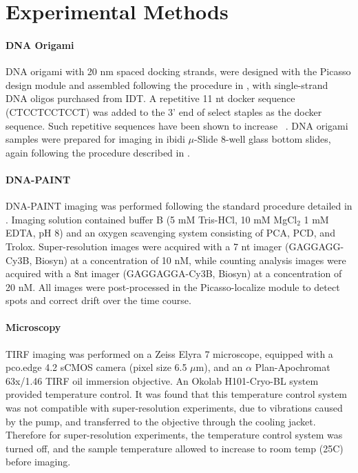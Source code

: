 \section{Experimental Methods}


\paragraph{DNA Origami}
DNA origami with 20 nm spaced docking strands, were designed with the Picasso design module \cite{schnitzbauer_2017}
and assembled following the procedure in \cite{schnitzbauer_2017}, with single-strand DNA oligos purchased from IDT.
  A repetitive 11 nt docker sequence (CTCCTCCTCCT) was added to the 3' end of select staples as the docker sequence.
  Such repetitive sequences have been shown to increase \pon~\citep{civitci_2020}.
  DNA origami samples were prepared for imaging in ibidi $\mu$-Slide 8-well glass bottom slides, 
  again following the procedure described in \cite{schnitzbauer_2017}. 
  
\paragraph{DNA-PAINT}
DNA-PAINT imaging was performed following the standard procedure detailed in \cite{schnitzbauer_2017}. 
  Imaging solution contained buffer B (5 mM Tris-HCl, 10 mM MgCl$_2$ 1 mM EDTA, pH 8) and an oxygen scavenging system consisting of PCA, PCD, and Trolox.
  Super-resolution images were acquired with a 7 nt imager (GAGGAGG-Cy3B, Biosyn) at a concentration of 10 nM,
  while counting analysis images were acquired with a 8nt imager (GAGGAGGA-Cy3B, Biosyn) at a concentration of 20 nM.
  All images were post-processed in the Picasso-localize module to detect spots and correct drift over the time course. 

\paragraph{Microscopy}

TIRF imaging was performed on a Zeiss Elyra 7 microscope, equipped with 
a pco.edge 4.2 sCMOS camera (pixel size 6.5 $\mu$m), and an $\alpha$ 
Plan-Apochromat 63x/1.46 TIRF oil immersion objective.
  An Okolab H101-Cryo-BL system provided temperature control. 
  It was found that this temperature control system was not compatible with super-resolution experiments, 
  due to vibrations caused by the pump, and transferred to the objective through the cooling jacket.
  Therefore for super-resolution experiments, the temperature control system was turned off, 
  and the sample temperature allowed to increase to room temp (25\textdegree C) before imaging.